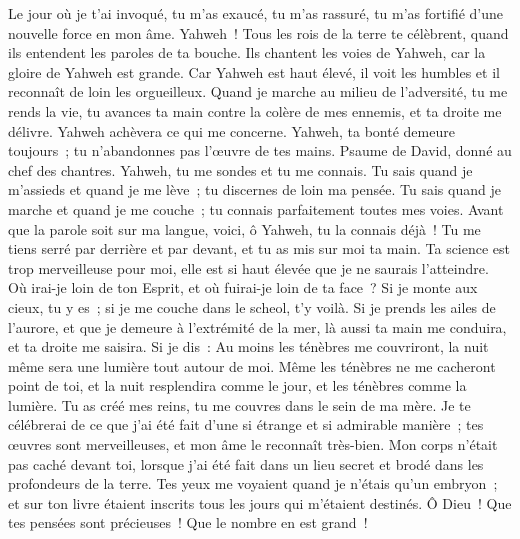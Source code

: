\begin{multicols}{2}
Le jour où je t'ai invoqué, tu m'as exaucé, tu m'as rassuré, tu m'as fortifié d'une nouvelle force en mon âme.
Yahweh~! Tous les rois de la terre te célèbrent, quand ils entendent les paroles de ta bouche.
Ils chantent les voies de Yahweh, car la gloire de Yahweh est grande.
Car Yahweh est haut élevé, il voit les humbles et il reconnaît de loin les orgueilleux.
Quand je marche au milieu de l'adversité, tu me rends la vie, tu avances ta main contre la colère de mes ennemis, et ta droite me délivre.
Yahweh achèvera ce qui me concerne. Yahweh, ta bonté demeure toujours~; tu n'abandonnes pas l'œuvre de tes mains.
\VerseOne{}Psaume de David, donné au chef des chantres. Yahweh, tu me sondes et tu me connais.
Tu sais quand je m'assieds et quand je me lève~; tu discernes de loin ma pensée.
Tu sais quand je marche et quand je me couche~; tu connais parfaitement toutes mes voies.
Avant que la parole soit sur ma langue, voici, ô Yahweh, tu la connais déjà~!
Tu me tiens serré par derrière et par devant, et tu as mis sur moi ta main. 
Ta science est trop merveilleuse pour moi, elle est si haut élevée que je ne saurais l'atteindre.
Où irai-je loin de ton Esprit, et où fuirai-je loin de ta face~?
Si je monte aux cieux, tu y es~; si je me couche dans le scheol, t'y voilà.
Si je prends les ailes de l'aurore, et que je demeure à l'extrémité de la mer,
là aussi ta main me conduira, et ta droite me saisira.
Si je dis~: Au moins les ténèbres me couvriront, la nuit même sera une lumière tout autour de moi.
Même les ténèbres ne me cacheront point de toi, et la nuit resplendira comme le jour, et les ténèbres comme la lumière.
Tu as créé mes reins, tu me couvres dans le sein de ma mère.
Je te célébrerai de ce que j'ai été fait d'une si étrange et si admirable manière~; tes œuvres sont merveilleuses, et mon âme le reconnaît très-bien.
Mon corps n'était pas caché devant toi, lorsque j'ai été fait dans un lieu secret et brodé dans les profondeurs de la terre.
Tes yeux me voyaient quand je n'étais qu'un embryon~; et sur ton livre étaient inscrits tous les jours qui m'étaient destinés.
Ô Dieu~! Que tes pensées sont précieuses~! Que le nombre en est grand~!

\end{multicols}

